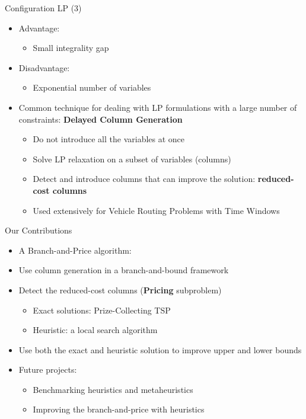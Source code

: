 \begin{frame}[t]{Configuration LP (3)}
    \begin{itemize}
        \item<1-> Advantage:
            \begin{itemize}
                \item<2-> Small integrality gap
            \end{itemize}
        \item<3-> Disadvantage: 
            \begin{itemize}
                \item<4-> Exponential number of variables
            \end{itemize}
        \item<5-> Common technique for dealing with LP formulations with a large number of constraints: \textbf{Delayed Column Generation}
            \begin{itemize}
                \item<6-> Do not introduce all the variables at once
                \item<7-> Solve LP relaxation on a subset of variables (columns)
                \item<8-> Detect and introduce columns that can improve the solution: \textbf{reduced-cost columns}
                \item<9-> Used extensively for Vehicle Routing Problems with Time Windows
            \end{itemize}
    \end{itemize}
\end{frame}

\begin{frame}[t]{Our Contributions}
    \label{our_method_bp}
    \begin{itemize}
        \item<1-> A \alert{Branch-and-Price} algorithm: 
        \item<2-> Use column generation in a branch-and-bound framework
        \item<3-> Detect the reduced-cost columns (\textbf{Pricing} subproblem)
            \begin{itemize}
                \item<4-> Exact solutions: \alert{Prize-Collecting TSP}
                \item<5-> Heuristic: a \alert{local search} algorithm 
            \end{itemize}
        \item<6-> Use both the exact and heuristic solution to improve upper and lower bounds \hyperlink{CLP2}{}        
        \item<7-> Future projects:
            \begin{itemize}
                \item<8-> Benchmarking heuristics and metaheuristics
                \item<9-> Improving the branch-and-price with heuristics
            \end{itemize}
    \end{itemize}
\end{frame}

